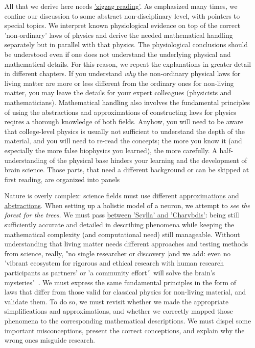  All that we derive here
needs \hyperlink{zigzagdiscussion}{'zigzag reading'}. 
As emphasized many times, we confine our discussion to some abstract 
non-disciplinary level, with pointers to special topics.
We interpret known physiological evidence on top of the correct 'non-ordinary' laws of physics and derive the needed mathematical handling
separately but in parallel with that physics.
The physiological conclusions should be understood even if one does not
understand the underlying physical and mathematical details.
For this reason, we repeat the explanations in greater detail in different chapters. 
If you understand \textit{why} the non-ordinary physical laws for 
living matter are more or less different from the ordinary ones
for non-living matter, you may leave the details for your expert colleagues (physicists and mathematicians).
Mathematical handling also involves the fundamental principles
of using the %
{abstractions and approximations} of constructing
laws for physics reqires a thorough knowledge of both fields.
Anyhow, you will need to be aware that college-level physics
is usually not sufficient to understand the depth of the material,
and you will need to re-read the concepts; the more you know it (and especially
the more false biophysics you learned), the more carefully. A half-understanding
of the physical base hinders your learning and the development of brain science.
Those parts, that need a different background or can be
skipped at first reading, are organized into panels


Nature is overly complex: science fields must use
different \hyperlink{Abstractions}{approximations and abstractions}.
When setting up a holistic model of a neuron, we attempt to \textit{see the forest for the trees}.
We must pass
\href{https://en.wikipedia.org/wiki/Charybdis}{between 'Scylla' and 'Charybdis'}:
being still
sufficiently accurate and detailed in describing phenomena while keeping the mathematical complexity
(and computational need) still manageable.
Without understanding that living matter needs different approaches and testing methods from science, really, "no single researcher or discovery 
[and we add: even no 'vibrant ecosystem for rigorous and ethical research with human research participants as partners' or 'a community effort']
will solve the brain’s mysteries"~\cite{BrainInitiative10:2024}.
We must express the same fundamental principles in the form of laws that differ from those valid for classical physics for non-living material, and validate them. To do so, we must revisit whether we made the appropriate simplifications and approximations, and whether we correctly mapped those phenomena to the corresponding mathematical descriptions. We must dispel some important misconceptions, present the correct conceptions, and explain why the wrong ones misguide research.



